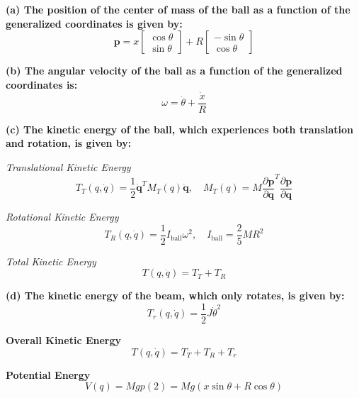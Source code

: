 \textbf{(a) The position of the center of mass of the ball as a function of the generalized coordinates is given by:}
\begin{equation}
\mathbf{p} = x \begin{bmatrix} \cos \theta \\ \sin \theta \end{bmatrix} + R \begin{bmatrix} -\sin \theta \\ \cos \theta \end{bmatrix}
\end{equation}

\textbf{(b) The angular velocity of the ball as a function of the generalized coordinates is:}
\begin{equation}
\omega = \dot{\theta} + \frac{\dot{x}}{R}
\end{equation}

\textbf{(c) The kinetic energy of the ball, which experiences both translation and rotation, is given by:}

\textit{Translational Kinetic Energy}
\begin{equation}
T_T(q, \dot{q}) = \frac{1}{2} \dot{\mathbf{q}}^T M_T(q) \dot{\mathbf{q}}, \quad M_T(q) = M \frac{\partial \mathbf{p}}{\partial \mathbf{q}}^T \frac{\partial \mathbf{p}}{\partial \mathbf{q}}
\end{equation}

\textit{Rotational Kinetic Energy}
\begin{equation}
T_R(q, \dot{q}) = \frac{1}{2} I_{\text{ball}} \omega^2, \quad I_{\text{ball}} = \frac{2}{5} M R^2
\end{equation}

\textit{Total Kinetic Energy}
\begin{equation}
T(q, \dot{q}) = T_T + T_R
\end{equation}

\textbf{(d) The kinetic energy of the beam, which only rotates, is given by:}
\begin{equation}
T_r(q, \dot{q}) = \frac{1}{2} J \dot{\theta}^2
\end{equation}

\textbf{Overall Kinetic Energy}
\begin{equation}
T(q, \dot{q}) = T_T + T_R + T_r
\end{equation}

\textbf{Potential Energy}
\begin{equation}
V(q) = Mg p(2) = Mg (x \sin \theta + R \cos \theta)
\end{equation}

